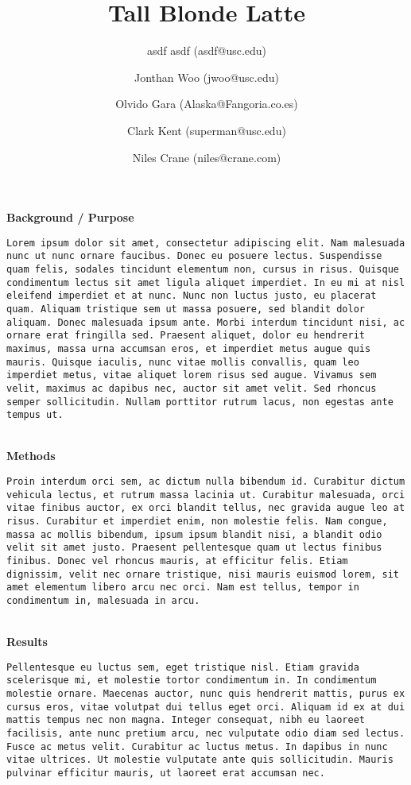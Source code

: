 \documentclass[11pt]{article}
\title{\vspace{-1cm}Tall Blonde Latte
}
\author[]{asdf asdf (asdf@usc.edu)}\author[]{Jonthan Woo (jwoo@usc.edu)}\author[]{Olvido Gara (Alaska@Fangoria.co.es)}\author[]{Clark Kent (superman@usc.edu)}\author[]{Niles Crane (niles@crane.com)}
\affil[]{}
\date{}
\begin{document}
\maketitle
\thispagestyle{fancyfirst}
{\bfseries\large Background / Purpose}
\begin{lstlisting}[mathescape]
Lorem ipsum dolor sit amet, consectetur adipiscing elit. Nam malesuada nunc ut nunc ornare faucibus. Donec eu posuere lectus. Suspendisse quam felis, sodales tincidunt elementum non, cursus in risus. Quisque condimentum lectus sit amet ligula aliquet imperdiet. In eu mi at nisl eleifend imperdiet et at nunc. Nunc non luctus justo, eu placerat quam. Aliquam tristique sem ut massa posuere, sed blandit dolor aliquam. Donec malesuada ipsum ante. Morbi interdum tincidunt nisi, ac ornare erat fringilla sed. Praesent aliquet, dolor eu hendrerit maximus, massa urna accumsan eros, et imperdiet metus augue quis mauris. Quisque iaculis, nunc vitae mollis convallis, quam leo imperdiet metus, vitae aliquet lorem risus sed augue. Vivamus sem velit, maximus ac dapibus nec, auctor sit amet velit. Sed rhoncus semper sollicitudin. Nullam porttitor rutrum lacus, non egestas ante tempus ut.
\end{lstlisting}
\hfill \\
{\bfseries\large Methods}
\begin{lstlisting}[mathescape]
Proin interdum orci sem, ac dictum nulla bibendum id. Curabitur dictum vehicula lectus, et rutrum massa lacinia ut. Curabitur malesuada, orci vitae finibus auctor, ex orci blandit tellus, nec gravida augue leo at risus. Curabitur et imperdiet enim, non molestie felis. Nam congue, massa ac mollis bibendum, ipsum ipsum blandit nisi, a blandit odio velit sit amet justo. Praesent pellentesque quam ut lectus finibus finibus. Donec vel rhoncus mauris, at efficitur felis. Etiam dignissim, velit nec ornare tristique, nisi mauris euismod lorem, sit amet elementum libero arcu nec orci. Nam est tellus, tempor in condimentum in, malesuada in arcu.
\end{lstlisting}
\hfill \\
{\bfseries\large Results}
\begin{lstlisting}[mathescape]
Pellentesque eu luctus sem, eget tristique nisl. Etiam gravida scelerisque mi, et molestie tortor condimentum in. In condimentum molestie ornare. Maecenas auctor, nunc quis hendrerit mattis, purus ex cursus eros, vitae volutpat dui tellus eget orci. Aliquam id ex at dui mattis tempus nec non magna. Integer consequat, nibh eu laoreet facilisis, ante nunc pretium arcu, nec vulputate odio diam sed lectus. Fusce ac metus velit. Curabitur ac luctus metus. In dapibus in nunc vitae ultrices. Ut molestie vulputate ante quis sollicitudin. Mauris pulvinar efficitur mauris, ut laoreet erat accumsan nec.
\end{lstlisting}
\end{document}
